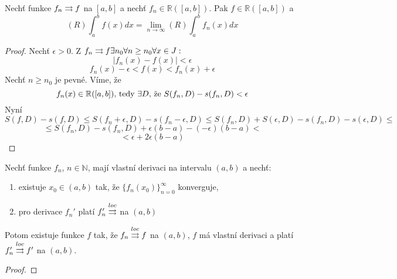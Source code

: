 \begin{vetal}
Nechť funkce $f_n \rightrightarrows f$ na $[a,b]$ a nechť $f_n \in \mathbb{R} ([a,b])$. Pak $f \in \mathbb{R}([a,b])$ a 
$$(R) \int_a^b f(x) dx = \lim_{n \rightarrow \infty} (R) \int_a^b f_n(x) dx$$
\end{vetal}
\begin{proof}
Nechť $\epsilon > 0$. Z $f_n \rightrightarrows f \exists n_0 \forall n \geq n_0 \forall x \in J:$
$$|f_n(x) - f(x)| < \epsilon$$
$$f_n(x) - \epsilon < f(x) < f_n(x) + \epsilon$$
Nechť $n \geq n_0$ je pevné. Víme, že 
$$\hbox{$f_n(x) \in \mathbb{R}([a,b])$, tedy $\exists D$, že $S(f_n,D) - s(f_n,D)<\epsilon$}$$
Nyní
$$S(f,D) - s(f,D) \leq S(f_n+\epsilon, D) - s(f_n-\epsilon,D) \leq S(f_n,D)+S(\epsilon,D) - s(f_n,D) - s(\epsilon,D) \leq $$ 
$$ \leq S(f_n,D) - s(f_n,D) +\epsilon(b-a) - (-\epsilon)(b-a) <$$
$$< \epsilon +2\epsilon(b-a)$$
\end{proof}

\begin{vetat}
Nechť funkce $f_n$, $n \in \mathbb{N}$, mají vlastní derivaci na intervalu $(a,b)$ a nechť:
\begin{enumerate}
\item existuje $x_0 \in (a,b)$ tak, že $\{f_n(x_0)\}_{n=0}^{\infty}$ konverguje,
\item pro derivace $f_n'$ platí $f_n' \overset{loc}{\rightrightarrows}$ na $(a,b)$
\end{enumerate}
Potom existuje funkce $f$ tak, že $f_n \overset{loc}{\rightrightarrows} f$ na $(a,b)$, $f$ má vlastní derivaci a platí $f_n' \overset{loc}{\rightrightarrows} f'$ na $(a,b)$.
\end{vetat}
\begin{proof}


\end{proof}
